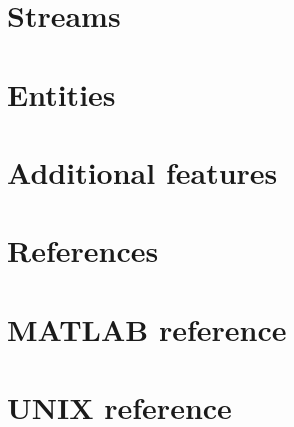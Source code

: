 \documentclass[10pt,a4paper,twoside]{book}
\begin{document}
\chapter{Streams}
\label{chap:streams}


\chapter{Entities}
\label{chap:entities}


\chapter{Additional features}
\label{chap:features}


\chapter*{References}



\appendix
%

\chapter{MATLAB reference}
\label{appendix:matlabReference}


\chapter{UNIX reference}
\label{appendix:unixReference}

\end{document}
